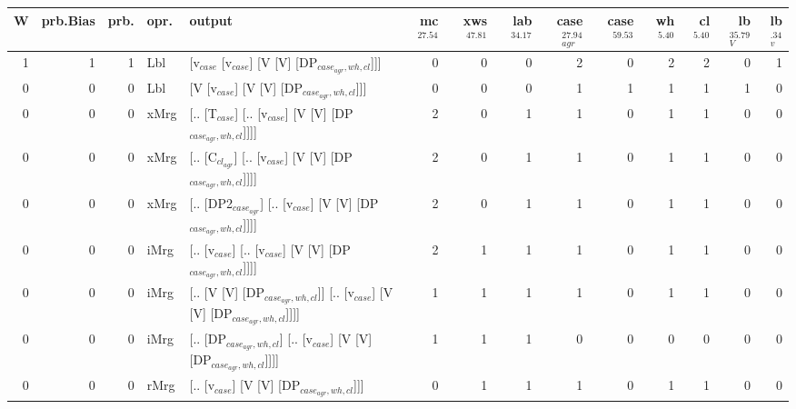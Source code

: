 \begin{tabularx}{\linewidth}{rrrlXrrrrrrrrr}
\hline
   W &   prb.Bias &   prb. & opr.   & output                                                                     &   mc$^{27.54}$ &   xws$^{47.81}$ &   lab$^{34.17}$ &   case$_{agr}^{27.94}$ &   case$^{59.53}$ &   wh$^{5.40}$ &   cl$^{5.40}$ &   lb$_{V}^{35.79}$ &   lb$_{v}^{.34}$ \\
\hline
   1 &       1 &   1 & Lbl  & [v$_{case}$ [v$_{case}$] [V [V] [DP$_{case_{agr},wh,cl}$]]]                              &            0 &             0 &             0 &                  2 &              0 &           2 &           2 &              0 &             1 \\
   0 &       0 &   0 & Lbl  & [V [v$_{case}$] [V [V] [DP$_{case_{agr},wh,cl}$]]]                                   &            0 &             0 &             0 &                  1 &              1 &           1 &           1 &              1 &             0 \\
   0 &       0 &   0 & xMrg & [.. [T$_{case}$] [.. [v$_{case}$] [V [V] [DP$_{case_{agr},wh,cl}$]]]]                    &            2 &             0 &             1 &                  1 &              0 &           1 &           1 &              0 &             0 \\
   0 &       0 &   0 & xMrg & [.. [C$_{cl_{agr}}$] [.. [v$_{case}$] [V [V] [DP$_{case_{agr},wh,cl}$]]]]                  &            2 &             0 &             1 &                  1 &              0 &           1 &           1 &              0 &             0 \\
   0 &       0 &   0 & xMrg & [.. [DP2$_{case_{agr}}$] [.. [v$_{case}$] [V [V] [DP$_{case_{agr},wh,cl}$]]]]              &            2 &             0 &             1 &                  1 &              0 &           1 &           1 &              0 &             0 \\
   0 &       0 &   0 & iMrg & [.. [v$_{case}$] [.. [v$_{case}$] [V [V] [DP$_{case_{agr},wh,cl}$]]]]                    &            2 &             1 &             1 &                  1 &              0 &           1 &           1 &              0 &             0 \\
   0 &       0 &   0 & iMrg & [.. [V [V] [DP$_{case_{agr},wh,cl}$]] [.. [v$_{case}$] [V [V] [DP$_{case_{agr},wh,cl}$]]]] &            1 &             1 &             1 &                  1 &              0 &           1 &           1 &              0 &             0 \\
   0 &       0 &   0 & iMrg & [.. [DP$_{case_{agr},wh,cl}$] [.. [v$_{case}$] [V [V] [DP$_{case_{agr},wh,cl}$]]]]         &            1 &             1 &             1 &                  0 &              0 &           0 &           0 &              0 &             0 \\
   0 &       0 &   0 & rMrg & [.. [v$_{case}$] [V [V] [DP$_{case_{agr},wh,cl}$]]]                                  &            0 &             1 &             1 &                  1 &              0 &           1 &           1 &              0 &             0 \\
\hline
\end{tabularx}\endgroup\\
